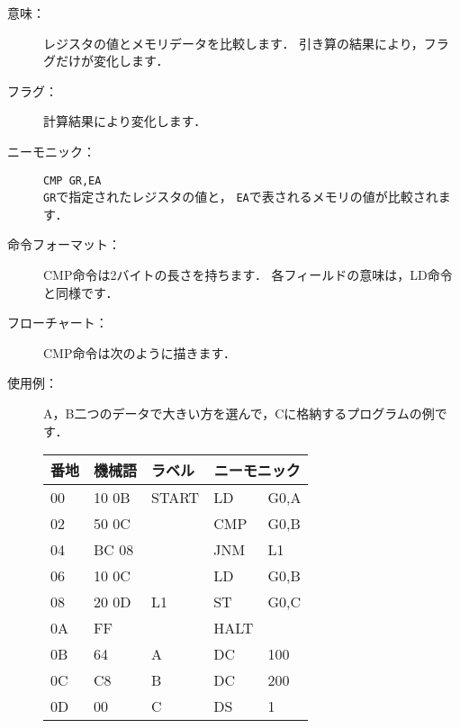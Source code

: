 \begin{description}
\item[意味：]レジスタの値とメモリデータを比較します．
  引き算の結果により，フラグだけが変化します．

\item[フラグ：]計算結果により変化します．

\item[ニーモニック：]\texttt{CMP  GR,EA} \\
  \texttt{GR}で指定されたレジスタの値と，
  \texttt{EA}で表されるメモリの値が比較されます．

\item[命令フォーマット：]CMP命令は2バイトの長さを持ちます．
  各フィールドの意味は，LD命令と同様です．


\item[フローチャート：]CMP命令は次のように描きます．

  \begin{center}
  \end{center}

\item[使用例：]
  A，B二つのデータで大きい方を選んで，Cに格納するプログラムの例です．

  {\ttfamily\begin{center}
    \begin{tabular}{|l|l|l|l l|} \hline
      番地 & 機械語 & ラベル & \multicolumn{2}{|c|}{ニーモニック} \\
      \hline
      00 & 10 0B & START & LD   & G0,A \\
      02 & 50 0C &       & CMP  & G0,B \\
      04 & BC 08 &       & JNM  & L1   \\
      06 & 10 0C &       & LD   & G0,B \\
      08 & 20 0D & L1    & ST   & G0,C \\
      0A & FF    &       & HALT & \\
      0B & 64    & A     & DC   & 100  \\
      0C & C8    & B     & DC   & 200  \\
      0D & 00    & C     & DS   & 1    \\
      \hline
    \end{tabular}
  \end{center}}
\end{description}


